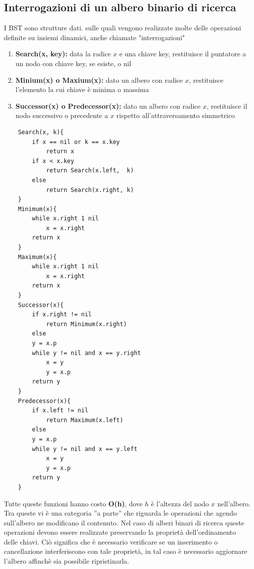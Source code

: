 \subsection{Interrogazioni di un albero binario di ricerca}
I BST sono strutture dati. sulle quali vengono realizzate molte delle operazioni definite su insiemi dinamici, anche chiamate "interrogazioni"
\begin{enumerate}
    \item \textbf{Search(x, key):} data la radice $x$ e una chiave key, restituisce il puntatore a un nodo con chiave key, se esiste, o nil
    \item \textbf{Minium(x) o Maxium(x):} dato un albero con radice $x$, restituisce l'elemento la cui chiave è minima o massima
    \item \textbf{Successor(x) o Predecessor(x):} dato un albero con radice $x$, restituisce il nodo successivo o precedente a $x$ rispetto all'attraversamento simmetrico
\end{enumerate}
\noindent \begin{verbatim}
    Search(x, k){
        if x == nil or k == x.key
            return x
        if x < x.key 
            return Search(x.left,  k)
        else
            return Search(x.right, k)
    }
    Minimum(x){
        while x.right 1 nil
            x = x.right
        return x
    }
    Maximum(x){
        while x.right 1 nil
            x = x.right
        return x
    }
    Successor(x){
        if x.right != nil
            return Minimum(x.right)
        else 
        y = x.p
        while y != nil and x == y.right
            x = y
            y = x.p 
        return y
    }
    Predecessor(x){
        if x.left != nil
            return Maximum(x.left)
        else 
        y = x.p
        while y != nil and x == y.left
            x = y
            y = x.p 
        return y
    }
\end{verbatim}
\noindent Tutte queste funzioni hanno costo \textbf{O(h)}, dove $h$ è l'altezza del nodo $x$ nell'albero.  \medskip\\
Tra queste vi è una categoria ”a parte” che riguarda le operazioni che agendo sull’albero ne
modificano il contenuto. Nel caso di alberi binari di ricerca queste operazioni devono essere
realizzate preservando la proprietà dell’ordinamento delle chiavi. Ciò significa che è necessario
 verificare se un inserimento o cancellazione interferiscono con tale proprietà, in tal caso è
necessario aggiornare l’albero affinchè sia possibile ripristinarla.
